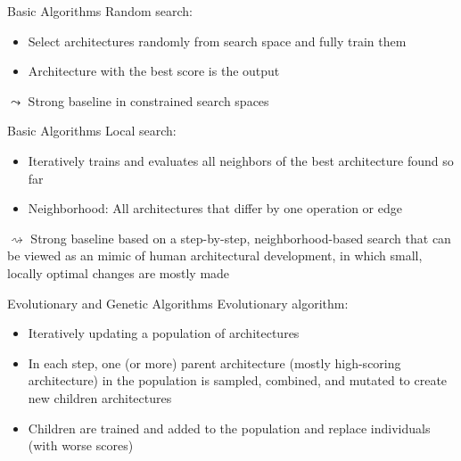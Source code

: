 \documentclass[main]{subfiles}
\begin{document}
\begin{frame}{Basic Algorithms}
Random search:
\begin{itemize}
    \item Select architectures randomly from search space and fully train them
    \item Architecture with the best score is the output
\end{itemize}
\pause
    $\leadsto$ Strong baseline in constrained search spaces

\end{frame}

\begin{frame}{Basic Algorithms}
Local search:
\begin{itemize}
    \item Iteratively trains and evaluates all neighbors of the best architecture found so far
    \item Neighborhood: All architectures that differ by one operation or edge
\end{itemize}
\pause
$\rightsquigarrow$  Strong baseline based on a step-by-step, neighborhood-based search that can be viewed as an mimic of human architectural development, in which small, locally optimal changes are mostly made
\end{frame}

\begin{frame}{Evolutionary and Genetic Algorithms}
Evolutionary algorithm:
\begin{itemize}
    \item Iteratively updating a population of architectures
    \item In each step, one (or more) parent architecture (mostly high-scoring architecture) in the population is sampled, combined, and mutated to create new children architectures
    \item Children are trained and added to the population and replace individuals (with worse scores)
\end{itemize}
\end{frame}
\end{document}
